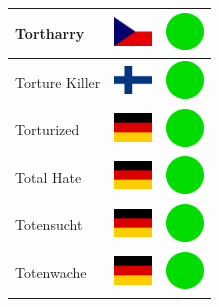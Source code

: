 \documentclass[12pt, a4paper, twoside]{report}
\begin{document}
\begin{center}
\begin{longtable}{|p{5cm}|p{2cm}|p{2cm}|}
 Tortharry                                                  & \includegraphics[width=1cm]{../img/flags/cz} &   \includegraphics[width=1cm]{../likes/y} \\ \hline
 Torture Killer                                             & \includegraphics[width=1cm]{../img/flags/fi} &   \includegraphics[width=1cm]{../likes/y} \\ \hline
 Torturized                                                 & \includegraphics[width=1cm]{../img/flags/de} &   \includegraphics[width=1cm]{../likes/y} \\ \hline
 Total Hate                                                 & \includegraphics[width=1cm]{../img/flags/de} &   \includegraphics[width=1cm]{../likes/y} \\ \hline
 Totensucht                                                 & \includegraphics[width=1cm]{../img/flags/de} &   \includegraphics[width=1cm]{../likes/y} \\ \hline
 Totenwache                                                 & \includegraphics[width=1cm]{../img/flags/de} &   \includegraphics[width=1cm]{../likes/y} \\ \hline

\end{longtable}
\end{center}
\end{document}
